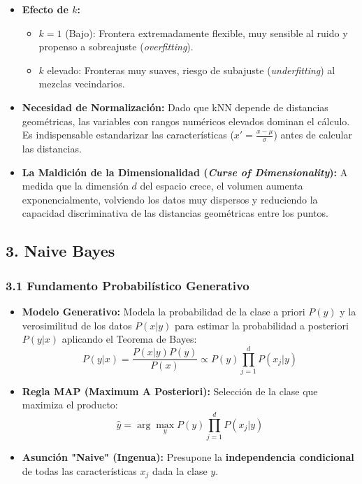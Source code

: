 \begin{itemize}
	\item \textbf{Efecto de $k$:}
	\begin{itemize}
		\item $k=1$ (Bajo): Frontera extremadamente flexible, muy sensible al ruido y propenso a sobreajuste (\emph{overfitting}).
		\item $k$ elevado: Fronteras muy suaves, riesgo de subajuste (\emph{underfitting}) al mezclas vecindarios.
	\end{itemize}
	
	\item \textbf{Necesidad de Normalización:} Dado que kNN depende de distancias geométricas, las variables con rangos numéricos elevados dominan el cálculo. Es indispensable estandarizar las características ($x' = \frac{x - \mu}{\sigma}$) antes de calcular las distancias.
	
	\item \textbf{La Maldición de la Dimensionalidad (\emph{Curse of Dimensionality}):} A medida que la dimensión $d$ del espacio crece, el volumen aumenta exponencialmente, volviendo los datos muy dispersos y reduciendo la capacidad discriminativa de las distancias geométricas entre los puntos.
\end{itemize}

\subsection{3. Naive Bayes}

\subsubsection{3.1 Fundamento Probabilístico Generativo}

\begin{itemize}
	\item \textbf{Modelo Generativo:} Modela la probabilidad de la clase a priori $P(y)$ y la verosimilitud de los datos $P(x|y)$ para estimar la probabilidad a posteriori $P(y|x)$ aplicando el Teorema de Bayes:
	$$P(y|x) = \frac{P(x|y)P(y)}{P(x)} \propto P(y) \prod_{j=1}^{d} P(x_j|y)$$
	
	\item \textbf{Regla MAP (Maximum A Posteriori):} Selección de la clase que maximiza el producto: 
	$$\hat{y} = \arg\max_{y} P(y) \prod_{j=1}^{d} P(x_j|y)$$
	
	\item \textbf{Asunción "Naive" (Ingenua):} Presupone la \textbf{independencia condicional} de todas las características $x_j$ dada la clase $y$.
\end{itemize}

